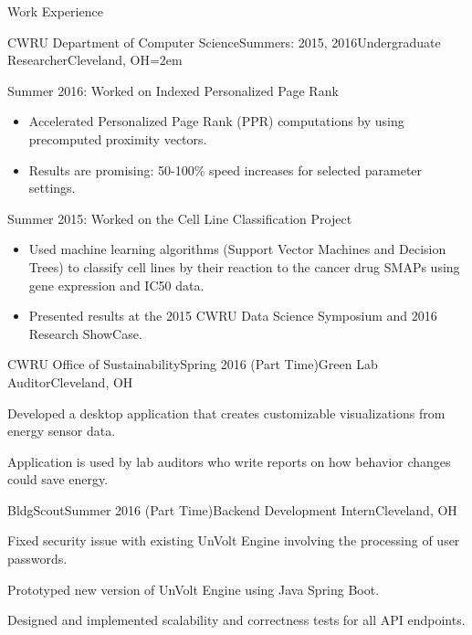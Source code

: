 \documentclass{resume} %
\begin{document}
\begin{rSection}{Work Experience}

\begin{rSubsection}{CWRU Department of Computer Science}{Summers: 2015, 2016}{Undergraduate Researcher}{Cleveland, OH}{\leftmargin=2em}

\item Summer 2016: Worked on Indexed Personalized Page Rank
{\renewcommand\labelitemi{$\cdot$}\vspace{-0.5em}
\begin{itemize}
\item Accelerated Personalized Page Rank (PPR) computations by using precomputed proximity vectors.
\vspace{-0.5em}  
\item Results are promising: 50-100\% speed increases for selected parameter settings.
\end{itemize}
}

\item Summer 2015: Worked on the Cell Line Classification Project
{\renewcommand\labelitemi{$\cdot$}\vspace{-0.5em}
\begin{itemize}
\item Used machine learning algorithms (Support Vector Machines and Decision Trees) to classify cell lines by their reaction to the cancer drug SMAPs using gene expression and IC50 data.
\vspace{-0.5em}  
\item Presented results at the 2015 CWRU Data Science Symposium and 2016 Research ShowCase.
\end{itemize}
}
\end{rSubsection}


\begin{rSubsection}{CWRU Office of Sustainability}{Spring 2016 (Part Time)}{Green Lab Auditor}{Cleveland, OH}
\item Developed a desktop application that creates customizable visualizations from energy sensor data.
\item Application is used by lab auditors who write reports on how behavior changes could save energy.
\end{rSubsection}

\begin{rSubsection}{BldgScout}{Summer 2016 (Part Time)}{Backend Development Intern}{Cleveland, OH}
\item Fixed security issue with existing UnVolt Engine involving the processing of user passwords.
\item Prototyped new version of UnVolt Engine using Java Spring Boot.
\item Designed and implemented scalability and correctness tests for all API endpoints.

\end{rSubsection}

\end{rSection}
\end{document}
